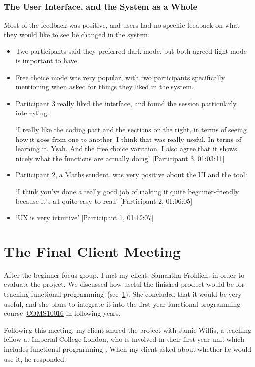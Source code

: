 \subsubsection{The User Interface, and the System as a Whole}
Most of the feedback was positive, and users had no specific feedback on what they would like to see be changed in the system. 

\begin{itemize}
    \item Two participants said they preferred dark mode, but both agreed light mode is important to have.
    
    \item Free choice mode was very popular, with two participants specifically mentioning when asked for things they liked in the system. 

    \item Participant 3 really liked the interface, and found the session particularly interesting:
    
    `I really like the coding part and the sections on the right, in terms of seeing how it goes from one to another. I think that was really useful. In terms of learning it. Yeah. And the free choice variation. I also agree that it shows nicely what the functions are actually doing' [Participant 3, 01:03:11]

    \item Participant 2, a Maths student, was very positive about the UI and the tool:
    
    `I think you've done a really good job of making it quite beginner-friendly because it's all quite easy to read' [Participant 2, 01:06:05]

    \item `UX is very intuitive' [Participant 1, 01:12:07]
\end{itemize}

\section{The Final Client Meeting}
\label{c4:client}
After the beginner focus group, I met my client, Samantha Frohlich, in order to evaluate the project. We discussed how useful the finished product would be for teaching functional programming~(see~\ref{c4:client}). She concluded that it would be very useful, and she plans to integrate it into the first year functional programming course~\hyperref[COMS10016]{COMS10016} in following years. 

Following this meeting, my client shared the project with Jamie Willis, a teaching fellow at Imperial College London, who is involved in their first year unit which includes functional programming \cite{imperialFP}. When my client asked about whether he would use it, he responded:

